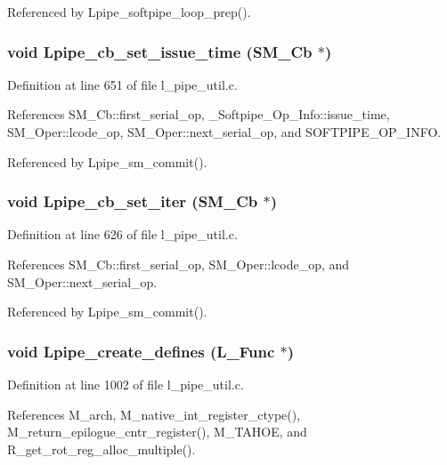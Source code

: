 Referenced by Lpipe\_\-softpipe\_\-loop\_\-prep().
\subsubsection{\setlength{\rightskip}{0pt plus 5cm}void Lpipe\_\-cb\_\-set\_\-issue\_\-time (\bf{SM\_\-Cb} $\ast$)}\label{l__pipe__util_8h_78c301317333e39c1f990dd753b7702a}




Definition at line 651 of file l\_\-pipe\_\-util.c.

References SM\_\-Cb::first\_\-serial\_\-op, \_\-Softpipe\_\-Op\_\-Info::issue\_\-time, SM\_\-Oper::lcode\_\-op, SM\_\-Oper::next\_\-serial\_\-op, and SOFTPIPE\_\-OP\_\-INFO.

Referenced by Lpipe\_\-sm\_\-commit().
\subsubsection{\setlength{\rightskip}{0pt plus 5cm}void Lpipe\_\-cb\_\-set\_\-iter (\bf{SM\_\-Cb} $\ast$)}\label{l__pipe__util_8h_ec1fbdb678fe723bd9872d734ef7647f}




Definition at line 626 of file l\_\-pipe\_\-util.c.

References SM\_\-Cb::first\_\-serial\_\-op, SM\_\-Oper::lcode\_\-op, and SM\_\-Oper::next\_\-serial\_\-op.

Referenced by Lpipe\_\-sm\_\-commit().
\subsubsection{\setlength{\rightskip}{0pt plus 5cm}void Lpipe\_\-create\_\-defines (L\_\-Func $\ast$)}\label{l__pipe__util_8h_ffea3cc897c410d1404e778a2337b577}




Definition at line 1002 of file l\_\-pipe\_\-util.c.

References M\_\-arch, M\_\-native\_\-int\_\-register\_\-ctype(), M\_\-return\_\-epilogue\_\-cntr\_\-register(), M\_\-TAHOE, and R\_\-get\_\-rot\_\-reg\_\-alloc\_\-multiple().

